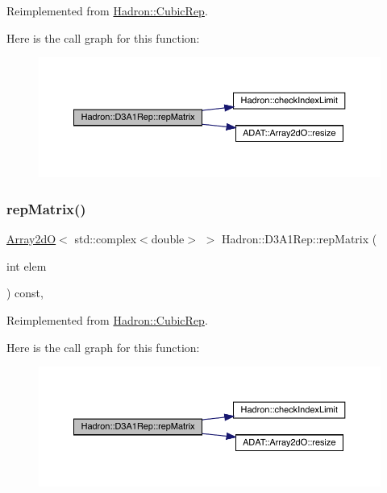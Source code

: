 Reimplemented from \mbox{\hyperlink{structHadron_1_1CubicRep_ac5d7e9e6f4ab1158b5fce3e4ad9e8005}{Hadron\+::\+Cubic\+Rep}}.

Here is the call graph for this function\+:
\nopagebreak
\begin{figure}[H]
\begin{center}
\leavevmode
\includegraphics[width=350pt]{d4/df6/structHadron_1_1D3A1Rep_a618d921105d92d30f7b3c838af644a74_cgraph}
\end{center}
\end{figure}
\mbox{\label{structHadron_1_1D3A1Rep_a618d921105d92d30f7b3c838af644a74}} 
\subsubsection{\texorpdfstring{repMatrix()}{repMatrix()}\hspace{0.1cm}{\footnotesize\ttfamily [3/3]}}
{\footnotesize\ttfamily \mbox{\hyperlink{classADAT_1_1Array2dO}{Array2dO}}$<$ std\+::complex$<$double$>$ $>$ Hadron\+::\+D3\+A1\+Rep\+::rep\+Matrix (\begin{DoxyParamCaption}\item[{int}]{elem }\end{DoxyParamCaption}) const\hspace{0.3cm}{\ttfamily [inline]}, {\ttfamily [virtual]}}



Reimplemented from \mbox{\hyperlink{structHadron_1_1CubicRep_ac5d7e9e6f4ab1158b5fce3e4ad9e8005}{Hadron\+::\+Cubic\+Rep}}.

Here is the call graph for this function\+:
\nopagebreak
\begin{figure}[H]
\begin{center}
\leavevmode
\includegraphics[width=350pt]{d4/df6/structHadron_1_1D3A1Rep_a618d921105d92d30f7b3c838af644a74_cgraph}
\end{center}
\end{figure}


